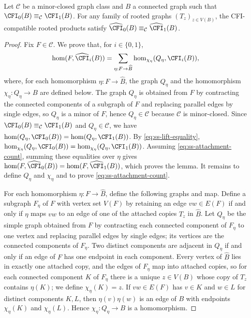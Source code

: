 

\begin{lemma}\label{lem:ss-attachments}
Let $\mathcal C$ be a minor-closed graph class and $B$ a connected graph
such that $\CFI_0(B)\equiv_{\mathcal C}\CFI_1(B)$.
For any family of rooted graphs $(T_z)_{z\in V(B)}$, the CFI-compatible
rooted products satisfy
$\widehat{\CFI}_0(B)\equiv_{\mathcal C}\widehat{\CFI}_1(B)$.
\end{lemma}
\begin{proof}
Fix $F\in\mathcal C$.
We prove that, for $i\in\{0,1\}$,
\begin{equation}\label{eq:ss-attachment-count}
 \hom(F,\widehat{\CFI}_i(B))=
 \sum_{\eta:F\to\widehat B}\hom_{\chi_\eta}(Q_\eta,\CFI_i(B)),
\end{equation}
where, for each homomorphism $\eta:F\to\widehat B$, the graph $Q_\eta$
and the homomorphism $\chi_\eta:Q_\eta\to B$ are defined below.
The graph $Q_\eta$ is obtained from $F$ by contracting the connected
components of a subgraph of $F$ and replacing parallel edges by single edges, so
$Q_\eta$ is a minor of $F$, hence $Q_\eta\in\mathcal C$ because
$\mathcal C$ is minor-closed.
Since $\CFI_0(B)\equiv_{\mathcal C}\CFI_1(B)$ and $Q_\eta\in\mathcal C$,
we have $\hom(Q_\eta,\CFI_0(B))=\hom(Q_\eta,\CFI_1(B))$.
By \cref{eq:ss-lift-equality},
$\hom_{\chi_\eta}(Q_\eta,\CFI_0(B))=\hom_{\chi_\eta}(Q_\eta,\CFI_1(B))$.
Assuming \cref{eq:ss-attachment-count}, summing these equalities over $\eta$
gives $\hom(F,\widehat{\CFI}_0(B))=\hom(F,\widehat{\CFI}_1(B))$, which
proves the lemma.
It remains to define $Q_\eta$ and $\chi_\eta$ and to prove
\cref{eq:ss-attachment-count}.

For each homomorphism $\eta:F\to\widehat B$, define the following graphs and map.
Define a subgraph $F_\eta$ of $F$
with vertex set $V(F)$ by retaining an edge $vw\in E(F)$ if and only if
$\eta$ maps $vw$ to an edge of one of the attached copies $T_z$ in $\widehat B$.
Let $Q_\eta$ be the simple graph obtained from $F$ by contracting each
connected component of $F_\eta$ to one vertex and replacing parallel
edges by single edges; its vertices are the connected components of $F_\eta$.
Two distinct components are adjacent in $Q_\eta$ if and only if an edge of
$F$ has one endpoint in each component.
Every vertex of $\widehat B$ lies in exactly one attached copy, and the
edges of $F_\eta$ map into attached copies, so for each connected
component $K$ of $F_\eta$ there is a unique $z\in V(B)$ whose copy of
$T_z$ contains $\eta(K)$; we define $\chi_\eta(K)=z$.
If $vw\in E(F)$ has $v\in K$ and $w\in L$ for distinct components $K,L$, then
$\eta(v)\eta(w)$ is an edge of $B$ with endpoints $\chi_\eta(K)$ and
$\chi_\eta(L)$.
Hence $\chi_\eta:Q_\eta\to B$ is a homomorphism.


\end{proof}
